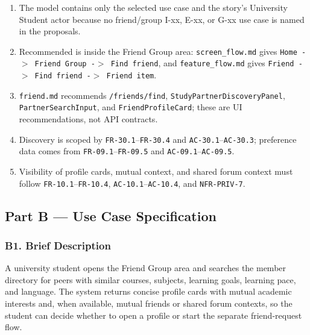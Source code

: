 \documentclass[12pt]{article}
\begin{document}
\begin{enumerate}
\item The model contains only the selected use case and the story's University Student actor because no friend/group I-xx, E-xx, or G-xx use case is named in the proposals.
\item Recommended is inside the Friend Group area: \texttt{screen\_flow.md} gives \texttt{Home -$>$ Friend Group -$>$ Find friend}, and \texttt{feature\_flow.md} gives \texttt{Friend -$>$ Find friend -$>$ Friend item}.
\item \texttt{friend.md} recommends \texttt{/friends/find}, \texttt{StudyPartnerDiscoveryPanel}, \texttt{PartnerSearchInput}, and \texttt{FriendProfileCard}; these are UI recommendations, not API contracts.
\item Discovery is scoped by \texttt{FR-30.1}--\texttt{FR-30.4} and \texttt{AC-30.1}--\texttt{AC-30.3}; preference data comes from \texttt{FR-09.1}--\texttt{FR-09.5} and \texttt{AC-09.1}--\texttt{AC-09.5}.
\item Visibility of profile cards, mutual context, and shared forum context must follow \texttt{FR-10.1}--\texttt{FR-10.4}, \texttt{AC-10.1}--\texttt{AC-10.4}, and \texttt{NFR-PRIV-7}.
\end{enumerate}
\par\medskip

\hypertarget{sec:part-b-use-case-specification}{}
\subsection*{Part B --- Use Case Specification}
\par\medskip

\hypertarget{sec:b1-brief-description}{}
\subsubsection*{B1. Brief Description}
\par\medskip

A university student opens the Friend Group area and searches the member directory for peers with similar courses, subjects, learning goals, learning pace, and language. The system returns concise profile cards with mutual academic interests and, when available, mutual friends or shared forum contexts, so the student can decide whether to open a profile or start the separate friend-request flow.
\par\medskip
\end{document}
